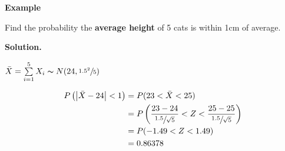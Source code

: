 \textbf{Example}

Find the probability the \textbf{average height} of 5 cats is within 1cm of average.

\textbf{Solution.}

$ \bar{X}=\sum\limits_{i=1}^{5} X_i \thicksim N(24,\sfrac{1.5^2}{5}) $

\begin{align*}
    P\left(\left|\bar{X}-24\right|<1\right) & =
    P(23<\bar{X}<25)                                                                          \\
                                            & =P\left( \frac{23-24}{\sfrac{1.5}{\sqrt{5}}}<Z<
    \frac{25-25}{\sfrac{1.5}{\sqrt{5}}} \right)                                               \\
                                            & =P(-1.49<Z<1.49)                                \\
                                            & =0.86378
\end{align*}
